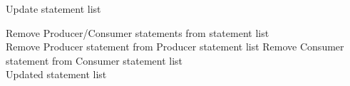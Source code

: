 \documentclass[a4paper]{article}
\begin{document}
\begin{algorithm}
\caption{Update statement list}
\begin{algorithmic}

    \State Remove Producer/Consumer statements from statement list
    \\
        \State Remove Producer statement from Producer statement list
        \State Remove Consumer statement from Consumer statement list
    \EndFor
    \\
    \Return Updated statement list

\EndProcedure

\end{algorithmic}
\end{algorithm}
\end{document}
